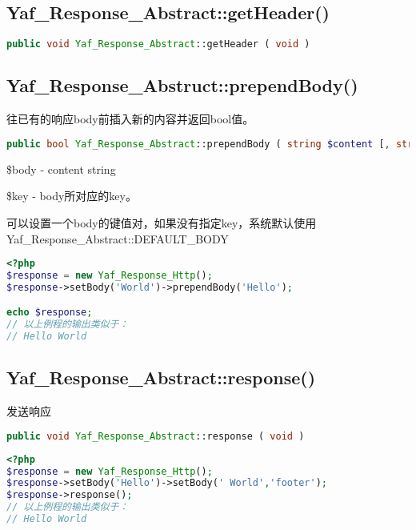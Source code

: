 \subsection{Yaf\_Response\_Abstract::getHeader()}

\begin{lstlisting}[language=PHP]
public void Yaf_Response_Abstract::getHeader ( void )
\end{lstlisting}



\subsection{Yaf\_Response\_Abstruct::prependBody()}

往已有的响应body前插入新的内容并返回bool值。

\begin{lstlisting}[language=PHP]
public bool Yaf_Response_Abstract::prependBody ( string $content [, string $key ] )
\end{lstlisting}

\begin{compactitem}
\item \$body - content string
\item \$key - body所对应的key。

可以设置一个body的键值对，如果没有指定key，系统默认使用Yaf\_Response\_Abstract::DEFAULT\_BODY
\end{compactitem}

\begin{lstlisting}[language=PHP]
<?php
$response = new Yaf_Response_Http();
$response->setBody('World')->prependBody('Hello');

echo $response;
// 以上例程的输出类似于：
// Hello World
\end{lstlisting}

\subsection{Yaf\_Response\_Abstract::response()}

发送响应


\begin{lstlisting}[language=PHP]
public void Yaf_Response_Abstract::response ( void )
\end{lstlisting}

\begin{lstlisting}[language=PHP]
<?php
$response = new Yaf_Response_Http();
$response->setBody('Hello')->setBody(' World','footer');
$response->response();
// 以上例程的输出类似于：
// Hello World
\end{lstlisting}



